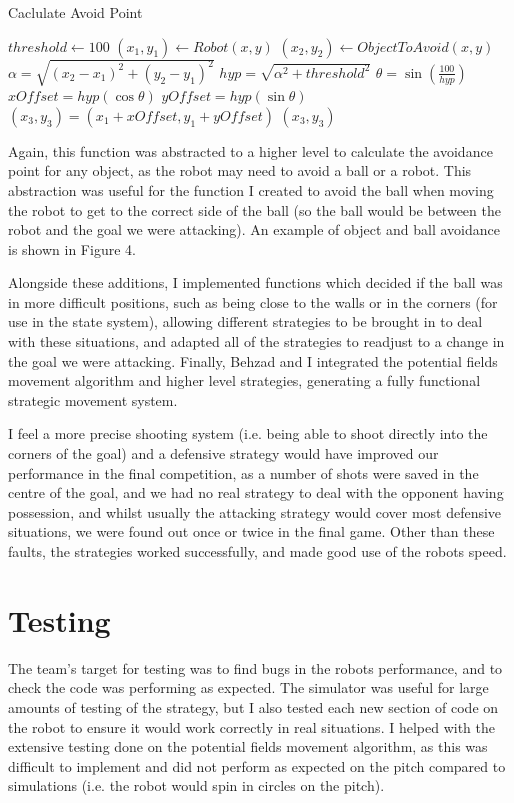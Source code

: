 \documentclass[12pt]{IEEEtran}
\begin{document}
\begin{algorithm}
\caption{Caclulate Avoid Point}
\begin{algorithmic}[1]
\STATE $threshold \gets 100$
\STATE $(x_{1}, y_{1}) \gets Robot (x, y)$
\STATE $(x_{2}, y_{2}) \gets Object To Avoid (x, y)$
\STATE $\alpha = \sqrt{(x_{2} - x_{1})^{2} + (y_{2} - y_{1})^{2}}$
\STATE $hyp = \sqrt{\alpha^{2} + threshold^{2}}$
\STATE $\theta = \sin(\frac{100}{hyp})$
\STATE $xOffset = hyp(\cos\theta)$
\STATE $yOffset = hyp(\sin\theta)$
\STATE $(x_{3}, y_{3}) = (x_{1} + xOffset, y_{1} + yOffset)$
\RETURN $(x_{3}, y_{3})$
\end{algorithmic}
\end{algorithm}

Again, this function was abstracted to a higher level to calculate the avoidance point for any object, as the robot may need to avoid a ball or a robot. This abstraction was useful for the function I created to avoid the ball when moving the robot to get to the correct side of the ball (so the ball would be between the robot and the goal we were attacking). An example of object and ball avoidance is shown in Figure 4. \linebreak

Alongside these additions, I implemented functions which decided if the ball was in more difficult positions, such as being close to the walls or in the corners (for use in the state system), allowing different strategies to be brought in to deal with these situations, and adapted all of the strategies to readjust to a change in the goal we were attacking.
Finally, Behzad and I integrated the potential fields movement algorithm and higher level strategies, generating a fully functional strategic movement system. \linebreak

I feel a more precise shooting system (i.e. being able to shoot directly into the corners of the goal) and a defensive strategy would have improved our performance in the final competition, as a number of shots were saved in the centre of the goal, and we had no real strategy to deal with the opponent having possession, and whilst usually the attacking strategy would cover most defensive situations, we were found out once or twice in the final game. Other than these faults, the strategies worked successfully, and made good use of the robots speed.

\section{Testing}
The team's target for testing was to find bugs in the robots performance, and to check the code was performing as expected. The simulator was useful for large amounts of testing of the strategy, but I also tested each new section of code on the robot to ensure it would work correctly in real situations. I helped with the extensive testing done on the potential fields movement algorithm, as this was difficult to implement and did not perform as expected on the pitch compared to simulations (i.e. the robot would spin in circles on the pitch). 
\end{document}
